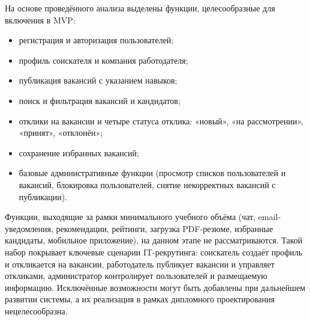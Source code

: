 На основе проведённого анализа выделены функции, целесообразные для включения в MVP:
\begin{itemize}
	\item регистрация и авторизация пользователей;
	\item профиль соискателя и компания работодателя;
	\item публикация вакансий с указанием навыков;
	\item поиск и фильтрация вакансий и кандидатов;
	\item отклики на вакансии и четыре статуса отклика: «новый», «на рассмотрении», «принят», «отклонён»;
	\item сохранение избранных вакансий;
	\item базовые административные функции (просмотр списков пользователей и вакансий, блокировка пользователей, снятие некорректных вакансий с публикации).
\end{itemize}

Функции, выходящие за рамки минимального учебного объёма (чат, email-уведомления, рекомендации, рейтинги, загрузка PDF-резюме, избранные кандидаты, мобильное приложение), на данном этапе не рассматриваются. Такой набор покрывает ключевые сценарии IT-рекрутинга: соискатель создаёт профиль и откликается на вакансии, работодатель публикует вакансии и управляет откликами, администратор контролирует пользователей и размещаемую информацию. Исключённые возможности могут быть добавлены при дальнейшем развитии системы, а их реализация в рамках дипломного проектирования нецелесообразна.



